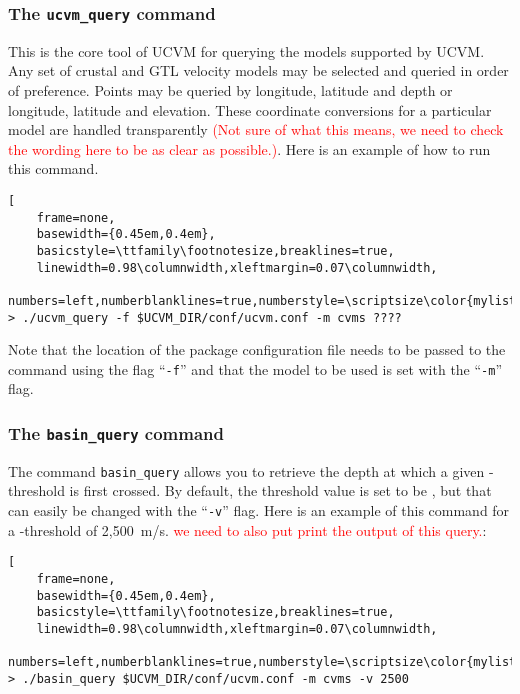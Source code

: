 \subsubsection{The \textup{\texttt{ucvm\_query}} command}

This is the core tool of UCVM for querying the models supported by UCVM. Any set of crustal and GTL velocity models may be selected and queried in order of preference. Points may be queried by longitude, latitude and depth or longitude, latitude and elevation. These coordinate conversions for a particular model are handled transparently \textcolor{red}{(Not sure of what this means, we need to check the wording here to be as clear as possible.)}. Here is an example of how to run this command.

\begin{lstlisting}[
	frame=none,
	basewidth={0.45em,0.4em},
	basicstyle=\ttfamily\footnotesize,breaklines=true,
	linewidth=0.98\columnwidth,xleftmargin=0.07\columnwidth,
	numbers=left,numberblanklines=true,numberstyle=\scriptsize\color{mylistingnclr}]
> ./ucvm_query -f $UCVM_DIR/conf/ucvm.conf -m cvms ????
\end{lstlisting}

Note that the location of the package configuration file needs to be passed to the command using the flag ``\texttt{-f}'' and that the model to be used is set with the ``\texttt{-m}'' flag. 

\subsubsection{The \textup{\texttt{basin\_query}} command}

The command \texttt{basin\_query} allows you to retrieve the depth at which a given \vs{}-threshold is first crossed. By default, the threshold value is set to be , but that can easily be changed with the ``\texttt{-v}'' flag. Here is an example of this command for a \vs-threshold of 2,500~m/s. \textcolor{red}{we need to also put print the output of this query.}:

\begin{lstlisting}[
	frame=none,
	basewidth={0.45em,0.4em},
	basicstyle=\ttfamily\footnotesize,breaklines=true,
	linewidth=0.98\columnwidth,xleftmargin=0.07\columnwidth,
	numbers=left,numberblanklines=true,numberstyle=\scriptsize\color{mylistingnclr}]
> ./basin_query $UCVM_DIR/conf/ucvm.conf -m cvms -v 2500
\end{lstlisting}

